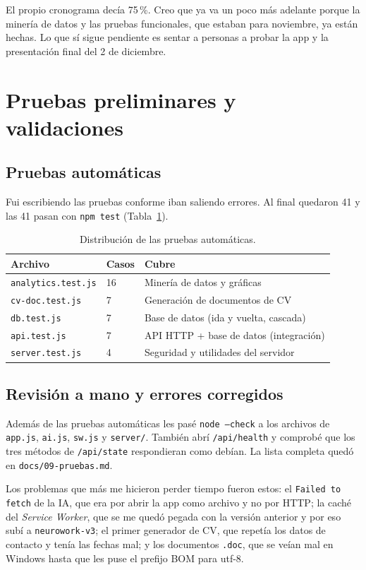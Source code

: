 \documentclass[runningheads]{llncs}
\begin{document}
El propio cronograma decía 75\,\%. Creo que ya va un poco más adelante porque la minería de
datos y las pruebas funcionales, que estaban para noviembre, ya están hechas. Lo que sí sigue
pendiente es sentar a personas a probar la app y la presentación final del 2 de diciembre.

\section{Pruebas preliminares y validaciones}
\subsection{Pruebas automáticas}
Fui escribiendo las pruebas conforme iban saliendo errores. Al final quedaron 41 y las 41
pasan con \texttt{npm test} (Tabla~\ref{tab:pruebas}).

\begin{table}[htbp]
\caption{Distribución de las pruebas automáticas.}
\label{tab:pruebas}
\centering
\small
\begin{tabular}{lll}
\toprule
Archivo & Casos & Cubre\\
\midrule
\texttt{analytics.test.js} & 16 & Minería de datos y gráficas\\
\texttt{cv-doc.test.js} & 7 & Generación de documentos de CV\\
\texttt{db.test.js} & 7 & Base de datos (ida y vuelta, cascada)\\
\texttt{api.test.js} & 7 & API HTTP + base de datos (integración)\\
\texttt{server.test.js} & 4 & Seguridad y utilidades del servidor\\
\bottomrule
\end{tabular}
\end{table}

\subsection{Revisión a mano y errores corregidos}
Además de las pruebas automáticas les pasé \texttt{node --check} a los archivos de
\texttt{app.js}, \texttt{ai.js}, \texttt{sw.js} y \texttt{server/}. También abrí
\texttt{/api/health} y comprobé que los tres métodos de \texttt{/api/state} respondieran como
debían. La lista completa quedó en \texttt{docs/09-pruebas.md}.

Los problemas que más me hicieron perder tiempo fueron estos: el \texttt{Failed to fetch} de la
IA, que era por abrir la app como archivo y no por HTTP; la caché del \emph{Service Worker}, que
se me quedó pegada con la versión anterior y por eso subí a \texttt{neurowork-v3}; el primer
generador de CV, que repetía los datos de contacto y tenía las fechas mal; y los documentos
\texttt{.doc}, que se veían mal en Windows hasta que les puse el prefijo BOM para utf-8.
\end{document}
